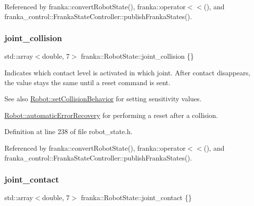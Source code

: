 Referenced by franka\+::convert\+Robot\+State(), franka\+::operator$<$$<$(), and franka\+\_\+control\+::\+Franka\+State\+Controller\+::publish\+Franka\+States().

\mbox{\label{structfranka_1_1RobotState_a38757bafd4dd8e138410de1dca0c36f8}} 
\subsubsection{\texorpdfstring{joint\+\_\+collision}{joint\_collision}}
{\footnotesize\ttfamily std\+::array$<$double, 7$>$ franka\+::\+Robot\+State\+::joint\+\_\+collision \{\}}

Indicates which contact level is activated in which joint. After contact disappears, the value stays the same until a reset command is sent.

\begin{DoxySeeAlso}{See also}
\hyperlink{classfranka_1_1Robot_a168e1214ac36d74ac64f894332b84534}{Robot\+::set\+Collision\+Behavior} for setting sensitivity values. 

\hyperlink{classfranka_1_1Robot_af682aa673415718715bd859116bc2fed}{Robot\+::automatic\+Error\+Recovery} for performing a reset after a collision. 
\end{DoxySeeAlso}


Definition at line 238 of file robot\+\_\+state.\+h.



Referenced by franka\+::convert\+Robot\+State(), franka\+::operator$<$$<$(), and franka\+\_\+control\+::\+Franka\+State\+Controller\+::publish\+Franka\+States().

\mbox{\label{structfranka_1_1RobotState_a7243c652a8efe58c343a0d1252302fa4}} 
\subsubsection{\texorpdfstring{joint\+\_\+contact}{joint\_contact}}
{\footnotesize\ttfamily std\+::array$<$double, 7$>$ franka\+::\+Robot\+State\+::joint\+\_\+contact \{\}}

